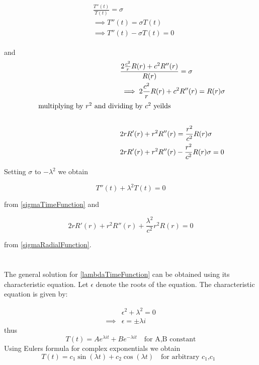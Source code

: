 \documentclass[10pt]{article}
\numberwithin{equation}{section}
\begin{document}
		\begin{align} 
			\begin{split}
				&\frac{T''(t)}{T(t)} = \sigma \\
				&\implies T''(t) = \sigma T(t) \\
				&\implies T''(t) - \sigma T(t) = 0\label{sigmaTimeFunction}
			\end{split}
		\end{align}	
		
		and	
		\begin{align}  
			\begin{split}
				\hspace{42mm}&\frac{2 \frac{c^2}{r} R(r) + c^2 R''(r)}{R(r)} = \sigma\\
				&\implies 2 \frac{c^2}{r} R(r) + c^2 R''(r) = R(r) \sigma\\
				\intertext{     multiplying by \(r^2\) and dividing by \(c^2\)  yeilds}\\
				&2 r R'(r) + r^2 R''(r) = \frac{r^2}{c^2} R(r) \sigma\\
				&2 r R'(r) + r^2 R''(r) - \frac{r^2}{c^2} R(r) \sigma = 0 \label{sigmaRadialFunction}
			\end{split}
		\end{align} 
		
		Setting \(\sigma\) to \(-\lambda^2\) we obtain 
		
		\begin{equation}
			T''(t) + \lambda^2 T(t) = 0 \label{lambdaTimeFunction}
		\end{equation}
		
		from \ref{sigmaTimeFunction} and
		
		\begin{equation}
			2 r R'(r) + r^2 R''(r) + \frac{\lambda^2}{c^2} r^2 R(r) = 0 \label{lambdaRadialFunction}
		\end{equation}
		
		from \ref{sigmaRadialFunction}.
		\section{}
		The general solution for \ref{lambdaTimeFunction} can be obtained using its characteristic equation. 			Let \(\epsilon\) denote the roots of the equation.
		The characteristic equation is given by:
		
		\begin{equation*}
			\begin{split}
				&\epsilon^2 + \lambda^2 = 0\\
				\implies &\epsilon = \pm\lambda i
			\end{split}
		\end{equation*}
		thus
		\begin{equation*}
			T(t) = A e^{\lambda i t} + B e^{-\lambda i t} \quad\text{for A,B constant}
		\end{equation*}
		Using Eulers formula for complex exponentials we obtain
		\begin{equation}
			T(t) = c_1 \sin(\lambda t) + c_2 \cos(\lambda t) \quad\text{for arbitrary \(c_1\),\(c_1\) } \label{TimeGeneralSolution}
		\end{equation}
		
\end{document}
